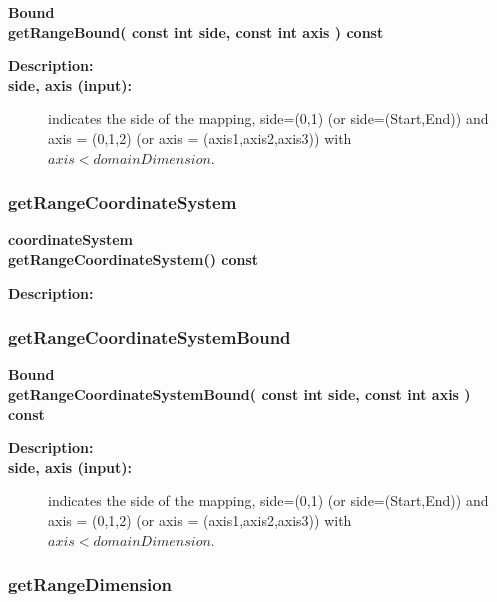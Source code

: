 \begin{flushleft} \textbf{%
Bound  \\ 
\settowidth{\MappingIncludeArgIndent}{getRangeBound(}%
getRangeBound( const int side, const int axis ) const
}\end{flushleft}
\begin{description}
\item[{\bf Description:}] 
\item[{\bf side, axis (input):}]  indicates the side of the mapping, side=(0,1) (or side=(Start,End)) 
     and axis = (0,1,2) (or axis = (axis1,axis2,axis3)) with $axis<domainDimension$.
\end{description}
\subsubsection{getRangeCoordinateSystem}
 
\begin{flushleft} \textbf{%
coordinateSystem  \\ 
\settowidth{\MappingIncludeArgIndent}{getRangeCoordinateSystem(}%
getRangeCoordinateSystem() const 
}\end{flushleft}
\begin{description}
\item[{\bf Description:}] 
\end{description}
\subsubsection{getRangeCoordinateSystemBound}
 
\begin{flushleft} \textbf{%
Bound  \\ 
\settowidth{\MappingIncludeArgIndent}{getRangeCoordinateSystemBound(}%
getRangeCoordinateSystemBound( const int side, const int axis ) const
}\end{flushleft}
\begin{description}
\item[{\bf Description:}] 
\item[{\bf side, axis (input):}]  indicates the side of the mapping, side=(0,1) (or side=(Start,End)) 
     and axis = (0,1,2) (or axis = (axis1,axis2,axis3)) with $axis<domainDimension$.
\end{description}
\subsubsection{getRangeDimension}
 

